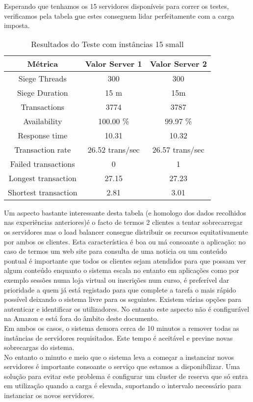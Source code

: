 Esperando que tenhamos os 15 servidores disponíveis para correr os testes, verificamos pela tabela \href{tabela:teste3} que estes conseguem lidar perfeitamente com a carga imposta. 
\begin{table}[ht]
\centering
\begin{tabular}{| c | c | c |}
\hline
 {\bf Métrica} &  {\bf Valor Server 1}  &  {\bf Valor Server 2} \\  \hline
	Siege  Threads 		& 300   & 300\\ \hline
	Siege  Duration 	&  15 m &  15m\\ \hline\hline
	Transactions 		& 3774  & 3787\\ \hline
	Availability 		&  100.00 \% & 99.97 \%  \\ \hline
	Response time 		&  10.31 & 10.32  \\ \hline
	Transaction rate 	&  26.52 trans/sec & 26.57 trans/sec \\ \hline
	Failed transactions &  0 & 1 \\ \hline
	Longest transaction &  27.15 & 27.23 \\ \hline
	Shortest transaction &  2.81 & 3.01 \\ \hline
  \end{tabular}
\caption{Resultados do Teste com instâncias 15 small}
\label{tabela:teste3}
\end{table}
Um aspecto bastante interessante desta tabela (e homologo dos dados recolhidos nas experiências anteriores)é o facto de termos 2 clientes a tentar sobrecarregar os servidores mas o load balancer consegue distribuir os recursos equitativamente por ambos os clientes. Esta característica é boa ou má consoante a aplicação: no caso de termos um web site para consulta de uma noticia ou um conteúdo pontual é importante que todos os clientes sejam atendidos para que possam ver algum conteúdo enquanto o sistema escala no entanto em aplicações como por exemplo sessões numa loja virtual ou inscrições num curso, é preferível dar prioridade a quem já está registado para que complete a tarefa o mais rápido possível deixando o sistema livre para os seguintes. Existem várias opções para autenticar e identificar os utilizadores. No entanto este aspecto não é configurável na Amazon e está fora do âmbito deste documento. \\
Em ambos os casos, o sistema demora cerca de 10 minutos a remover todas as instâncias de servidores requisitados. Este tempo é aceitável e previne novas sobrecargas do sistema.\\
No entanto o minuto e meio que o sistema leva a começar a instanciar novos servidores é importante consoante o serviço que estamos a disponibílizar. Uma solução para evitar este problema é configurar um cluster de reserva que só entra em utilização quando a carga é elevada, suportando o intervalo necessário para instanciar os novos servidores. 

